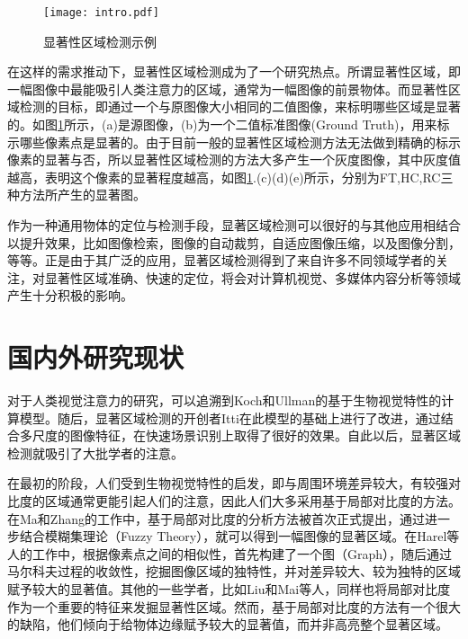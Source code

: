 \begin{figure}[b]
\texttt{[image: intro.pdf]}
\caption{显著性区域检测示例}\label{fig:intro}
\end{figure}

在这样的需求推动下，显著性区域检测成为了一个研究热点。所谓显著性区域，即一幅图像中最能吸引人类注意力的区域，通常为一幅图像的前景物体。而显著性区域检测的目标，即通过一个与原图像大小相同的二值图像，来标明哪些区域是显著的。如图\ref{fig:intro}所示，(a)是源图像，(b)为一个二值标准图像(Ground Truth)，用来标示哪些像素点是显著的。由于目前一般的显著性区域检测方法无法做到精确的标示像素的显著与否，所以显著性区域检测的方法大多产生一个灰度图像，其中灰度值越高，表明这个像素的显著程度越高，如图\ref{fig:intro}.(c)(d)(e)所示，分别为FT\cite{achanta2009frequency},HC\cite{cheng2011global},RC\cite{cheng2011global}三种方法所产生的显著图。

作为一种通用物体的定位与检测手段，显著区域检测可以很好的与其他应用相结合以提升效果，比如图像检索\cite{tsai2012hierarchical}\cite{fang2012effective}，图像的自动裁剪\cite{shechtman2013methods}\cite{deigmoeller2010context}，自适应图像压缩\cite{christopoulos2000jpeg2000}，以及图像分割\cite{jiang2011automatic}\cite{han2006unsupervised}，等等。正是由于其广泛的应用，显著区域检测得到了来自许多不同领域学者的关注，对显著性区域准确、快速的定位，将会对计算机视觉、多媒体内容分析等领域产生十分积极的影响。

\section{国内外研究现状}
对于人类视觉注意力的研究，可以追溯到Koch和Ullman\cite{koch1987shifts}的基于生物视觉特性的计算模型。随后，显著区域检测的开创者Itti\cite{itti1998model}在此模型的基础上进行了改进，通过结合多尺度的图像特征，在快速场景识别上取得了很好的效果。自此以后，显著区域检测就吸引了大批学者的注意。

在最初的阶段，人们受到生物视觉特性的启发，即与周围环境差异较大，有较强对比度的区域通常更能引起人们的注意，因此人们大多采用基于局部对比度的方法。在Ma和Zhang的工作中\cite{ma2003contrast}，基于局部对比度的分析方法被首次正式提出，通过进一步结合模糊集理论（Fuzzy Theory），就可以得到一幅图像的显著区域。在Harel等人的工作中\cite{harel2006graph}，根据像素点之间的相似性，首先构建了一个图（Graph），随后通过马尔科夫过程的收敛性，挖掘图像区域的独特性，并对差异较大、较为独特的区域赋予较大的显著值。其他的一些学者，比如Liu\cite{liu2011learning}和Mai\cite{maisaliency}等人，同样也将局部对比度作为一个重要的特征来发掘显著性区域。然而，基于局部对比度的方法有一个很大的缺陷，他们倾向于给物体边缘赋予较大的显著值，而并非高亮整个显著区域。


